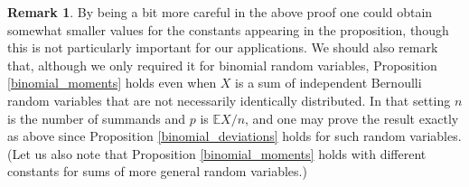 \documentclass[12pt,a4paper,reqno]{amsart}
\numberwithin{equation}{section}
\theoremstyle{plain}
\theoremstyle{definition}
\newtheorem{remark}[theorem]{Remark}
\def\E{\mathbb{E}}
\begin{document}
\begin{remark}
By being a bit more careful in the above proof one could obtain somewhat smaller values for the constants appearing in the proposition, though this is not particularly important for our applications. We should also remark that, although we only required it for binomial random variables, Proposition \ref{binomial_moments} holds even when $X$ is a sum of independent Bernoulli random variables that are not necessarily identically distributed. In that setting $n$ is the number of summands and $p$ is $\E X/n$, and one may prove the result exactly as above since Proposition \ref{binomial_deviations} holds for such random variables. (Let us also note that Proposition \ref{binomial_moments} holds with different constants for sums of more general random variables.)
\end{remark}
\end{document}
